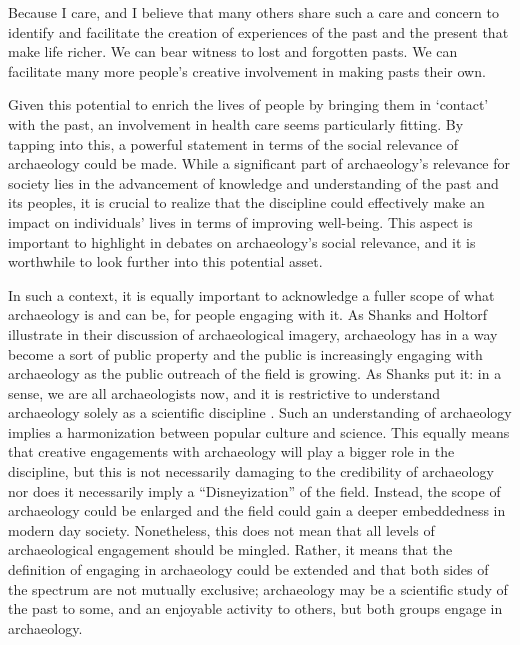 \begin{aquote}{\cite[19]{Shanks_2012b}}
Because I care, and I believe that many others share such a care and concern to identify and facilitate the creation of experiences of the past and the present that make life richer. We can bear witness to lost and forgotten pasts. We can facilitate many more people’s creative involvement in making pasts their own.
	\end{aquote}			
	Given this potential to enrich the lives of people by bringing them in ‘contact’ with the past, an involvement in health care seems particularly fitting. By tapping into this, a powerful statement in terms of the social relevance of archaeology could be made. While a significant part of archaeology’s relevance for society lies in the advancement of knowledge and understanding of the past and its peoples, it is crucial to realize that the discipline could effectively make an impact on individuals’ lives in terms of improving well-being. This aspect is important to highlight in debates on archaeology’s social relevance, and it is worthwhile to look further into this potential asset. 	
		
	In such a context, it is equally important to acknowledge a fuller scope of what archaeology is and can be, for people engaging with it. As Shanks and Holtorf illustrate in their discussion of archaeological imagery, archaeology has in a way become a sort of public property and the public is increasingly engaging with archaeology as the public outreach of the field is growing. As Shanks put it: in a sense, we are all archaeologists now, and it is restrictive to understand archaeology solely as a scientific discipline \parencite[41--42]{Shanks_2012a}. Such an understanding of archaeology implies a harmonization between popular culture and science. This equally means that creative engagements with archaeology will play a bigger role in the discipline, but this is not necessarily damaging to the credibility of archaeology nor does it necessarily imply a “Disneyization” \parencite[139,157]{Holtorf_2005} of the field. Instead, the scope of archaeology could be enlarged and the field could gain a deeper embeddedness in modern day society. Nonetheless, this does not mean that all levels of archaeological engagement should be mingled. Rather, it means that the definition of engaging in archaeology could be extended and that both sides of the spectrum are not mutually exclusive; archaeology may be a scientific study of the past to some, and an enjoyable activity to others, but both groups engage in archaeology.
	
